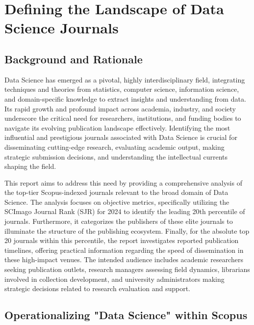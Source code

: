 \documentclass[../main.tex]{subfiles}
\begin{document}
\section{Defining the Landscape of Data Science Journals}

\subsection{Background and Rationale}

\vspace{0.4cm}
\noindent
Data Science has emerged as a pivotal, highly interdisciplinary field, integrating techniques and theories from statistics, computer science, information science, and domain-specific knowledge to extract insights and understanding from data. Its rapid growth and profound impact across academia, industry, and society underscore the critical need for researchers, institutions, and funding bodies to navigate its evolving publication landscape effectively. Identifying the most influential and prestigious journals associated with Data Science is crucial for disseminating cutting-edge research, evaluating academic output, making strategic submission decisions, and understanding the intellectual currents shaping the field.
    
\vspace{0.4cm}
\noindent
This report aims to address this need by providing a comprehensive analysis of the top-tier Scopus-indexed journals relevant to the broad domain of Data Science. The analysis focuses on objective metrics, specifically utilizing the SCImago Journal Rank (SJR) for 2024 to identify the leading 20th percentile of journals. Furthermore, it categorizes the publishers of these elite journals to illuminate the structure of the publishing ecosystem. Finally, for the absolute top 20 journals within this percentile, the report investigates reported publication timelines, offering practical information regarding the speed of dissemination in these high-impact venues. The intended audience includes academic researchers seeking publication outlets, research managers assessing field dynamics, librarians involved in collection development, and university administrators making strategic decisions related to research evaluation and support.

\subsection{Operationalizing "Data Science" within Scopus}
    
\end{document}
